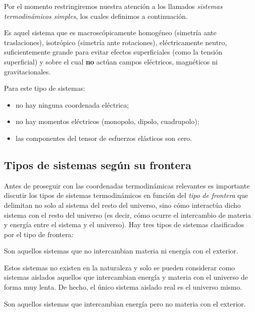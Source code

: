 Por el momento restringiremos nuestra atención a los llamados \emph{sistemas termodinámicos
simples}, los cuales definimos a continuación.

\begin{definicion}
  Es aquel sistema que es macroscópicamente homogéneo (simetría ante traslaciones), isotrópico
  (simetría ante rotaciones), eléctricamente neutro, suficientemente grande para evitar efectos
  superficiales (como la tensión superficial) y sobre el cual \textbf{no} actúan campos
  eléctricos, magnéticos ni gravitacionales.
\end{definicion}

Para este tipo de sistemas:
\begin{itemize}[itemsep=0pt]
  \item no hay ninguna coordenada eléctrica;
  \item no hay momentos eléctricos (monopolo, dipolo, cuadrupolo);
  \item las componentes del tensor de esfuerzos elásticos son cero.
\end{itemize}

\subsection*{Tipos de sistemas según su frontera}

Antes de proseguir con las coordenadas termodinámicas relevantes es importante discutir los tipos
de sistemas termodinámicos en función del \emph{tipo de frontera} que delimitan no solo al
sistema del resto del universo, sino cómo interactúa dicho sistema con el resto del universo (es
decir, cómo ocurre el intercambio de materia y energía entre el sistema y el universo). Hay tres
tipos de sistemas clasificados por el tipo de frontera:

\begin{definicion}
  Son aquellos sistemas que no intercambian materia ni energía con el exterior.
\end{definicion}

Estos sistemas no existen en la naturaleza y solo se pueden considerar como sistemas aislados
aquellos que intercambian energía y materia con el universo de forma muy lenta. De hecho, el
único sistema aislado real es el universo mismo.

\begin{definicion}
  Son aquellos sistemas que intercambian energía pero no materia con el exterior.
\end{definicion}

